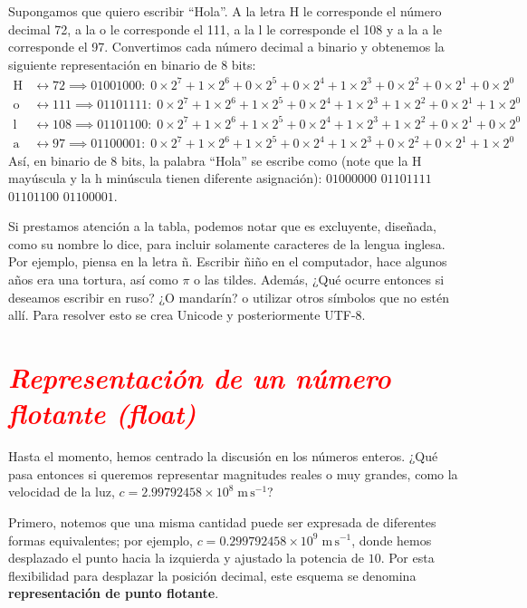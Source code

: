 \documentclass[12pt]{article}
\begin{document}
Supongamos que quiero escribir ``Hola''.  A la letra H le corresponde el número decimal 72, 
a la o le corresponde el 111, a la l le corresponde el 108 y a la a le corresponde el 97. Convertimos 
cada número decimal a binario y obtenemos la siguiente representación en binario de 8 bits:
\begin{align*}
\text{H} &\leftrightarrow 72 \implies 01001000:\; 0 \times 2^7 + 1 \times 2^6 + 0 \times 2^5 
+ 0 \times 2^4 + 1 \times 2^3 + 0 \times 2^2 + 0 \times 2^1 + 0 \times 2^0  \\
\text{o} &\leftrightarrow 111 \implies 01101111:\; 0 \times 2^7 + 1 \times 2^6 + 1 \times 2^5 
+ 0 \times 2^4 + 1 \times 2^3 + 1 \times 2^2 + 0 \times 2^1 + 1 \times 2^0  \\
\text{l} &\leftrightarrow 108 \implies 01101100:\; 0 \times 2^7 + 1 \times 2^6 + 1 \times 2^5 
+ 0 \times 2^4 + 1 \times 2^3 + 1 \times 2^2 + 0 \times 2^1 + 0 \times 2^0  \\
\text{a} &\leftrightarrow 97 \implies 01100001:\; 0 \times 2^7 + 1 \times 2^6 + 1 \times 2^5 
+ 0 \times 2^4 + 1 \times 2^3 + 0 \times 2^2 + 0 \times 2^1 + 1 \times 2^0  
\end{align*}
Así, en binario de 8 bits, la palabra ``Hola'' se escribe como (note que la H mayúscula y la h minúscula
tienen diferente asignación): $01000000$  $01101111$ $01101100$ $01100001$.

Si prestamos atención a la tabla, podemos notar que es excluyente, diseñada, 
como su nombre lo dice, para incluir solamente caracteres de la lengua inglesa.
Por ejemplo, piensa en la letra ñ. Escribir ñiño en el computador, 
hace algunos años era una tortura, así como $\pi$ o las tildes.
Además, ¿Qué ocurre entonces si deseamos escribir en ruso? ¿O mandarín? o utilizar otros
símbolos que no estén allí. Para resolver esto se crea Unicode y posteriormente UTF-8.

\section*{\textcolor{red}{\textit{ Representación de un número flotante (float)}}}

Hasta el momento, hemos centrado la discusión en los números enteros. 
¿Qué pasa entonces si queremos representar magnitudes reales o muy grandes, 
como la velocidad de la luz, 
$c = 2.99792458 \times 10^8 \;\mathrm{m\,s}^{-1}$?

\noindent Primero, notemos que una misma cantidad puede ser expresada de diferentes formas equivalentes; por ejemplo,
$c = 0.299792458 \times 10^9 \;\mathrm{m\,s}^{-1}$, donde hemos desplazado el punto hacia la izquierda 
y ajustado la potencia de $10$. Por esta flexibilidad para desplazar la posición decimal, este esquema se denomina 
\textbf{representación de punto flotante}.
\end{document}
